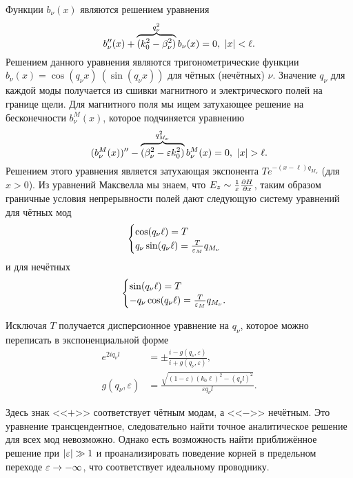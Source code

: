Функции $b_\nu(x)$ являются 
решением уравнения 
\begin{equation}
  b''_\nu(x) + \overbrace{(k_{0}^{2}-\beta_\nu^{2})}^{q_{\nu}^{2}}b_\nu(x) = 0, \ \abs{x}<\ell.
\end{equation}
Решением данного уравнения являются тригонометрические функции $b_\nu(x) = \cos(q_\nu x) \ (\sin(q_\nu x))$ для чётных (нечётных) $\nu$. Значение $q_\nu$ для каждой моды получается из сшивки
магнитного и электрического полей на границе щели.
Для магнитного поля мы ищем затухающее решение на бесконечности $b_\nu^M(x)$, которое подчиняется уравнению
\begin{equation}
  (b^M_\nu(x))'' - \overbrace{(\beta_\nu^{2}-\varepsilon k_{0}^{2})}^{q_{M_\nu}^{2}}b^M_\nu(x) = 0, \ \lvert x\rvert>\ell.
\end{equation}
Решением этого уравнения является затухающая экспонента $T e^{-(x-\ell)q_{M_\nu} }$ (для $x>0$). 
Из уравнений Максвелла мы знаем, что $E_z \sim \frac{1}{\varepsilon} \frac{\partial H}{\partial x}$, таким образом граничные условия непрерывности полей дают следующую систему уравнений для чётных мод 
\begin{equation}
    \begin{cases}
        \cos(q_\nu \ell) = T \\
        q_\nu \sin (q_\nu \ell)  = \frac{T}{\varepsilon_M} q_{M_\nu}
    \end{cases}
\end{equation}
и для нечётных
\begin{equation}
    \begin{cases}
        \sin(q_\nu \ell) = T \\
        -q_\nu \cos (q_\nu \ell)  = \frac{T}{\varepsilon_M} q_{M_\nu}. 
    \end{cases}
\end{equation}

Исключая $T$ получается дисперсионное уравнение на $q_\nu$, которое можно переписать в экспоненциальной форме
\begin{align}
e^{2i q_\nu l} &= \pm \frac{i-g(q_\nu,\varepsilon)}{i+g(q_\nu,\varepsilon)},\label{eq:BoundCond} \\
g(q_\nu,\varepsilon) & = \frac{\sqrt{(1-\varepsilon)(k_0 \ell)^2 - (q_\nu l)^2}}{\varepsilon q_\nu l}.  \nonumber
\end{align}

Здесь знак <<$+$>> соответствует чётным модам, а <<$-$>> нечётным. Это уравнение трансцендентное, следовательно найти точное аналитическое решение
для всех мод невозможно. Однако есть возможность найти приближённое решение при  $\lvert\varepsilon\rvert \gg 1$ и проанализировать поведение корней в предельном переходе $\varepsilon \to -\infty$, что соответствует идеальному проводнику.

